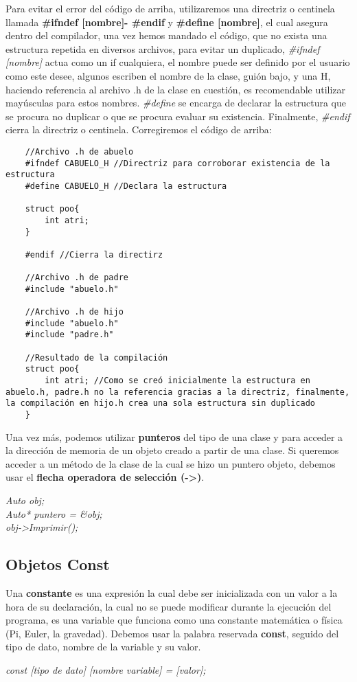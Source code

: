 Para evitar el error del código de arriba, utilizaremos una directriz o centinela llamada \textbf{\#ifndef [nombre]- \#endif} y \textbf{\#define [nombre]}, el cual asegura dentro del compilador, una vez hemos mandado el código, que no exista una estructura repetida en diversos archivos, para evitar un duplicado, \textit{\#ifndef [nombre]} actua como un if cualquiera, el nombre puede ser definido por el usuario como este desee, algunos escriben el nombre de la clase, guión bajo, y una H, haciendo referencia al archivo .h de la clase en cuestión, es recomendable utilizar mayúsculas para estos nombres. \textit{\#define} se encarga de declarar la estructura que se procura no duplicar o que se procura evaluar su existencia. Finalmente, \textit{\#endif} cierra la directriz o centinela. Corregiremos el código de arriba:
\begin{lstlisting}
    //Archivo .h de abuelo
    #ifndef CABUELO_H //Directriz para corroborar existencia de la estructura
    #define CABUELO_H //Declara la estructura
    
    struct poo{
        int atri;
    }
    
    #endif //Cierra la directirz
    
    //Archivo .h de padre
    #include "abuelo.h"
    
    //Archivo .h de hijo
    #include "abuelo.h"
    #include "padre.h"
    
    //Resultado de la compilación
    struct poo{
        int atri; //Como se creó inicialmente la estructura en abuelo.h, padre.h no la referencia gracias a la directriz, finalmente, la compilación en hijo.h crea una sola estructura sin duplicado
    }
\end{lstlisting}

Una vez más, podemos utilizar \textbf{punteros} del tipo de una clase y para acceder a la dirección de memoria de un objeto creado a partir de una clase. Si queremos acceder a un método de la clase de la cual se hizo un puntero objeto, debemos usar  el \textbf{flecha operadora de selección (->)}.
\begin{center}
    \textit{
        Auto obj; \\
        Auto* puntero = \&obj; \\
        obj->Imprimir();
    }
\end{center}


\subsection{Objetos Const}
\hspace{0.55cm}Una \textbf{constante} es una expresión la cual debe ser inicializada con un valor a la hora de su declaración, la cual no se puede modificar durante la ejecución del programa, es una variable que funciona como una constante matemática o física (Pi, Euler, la gravedad). Debemos usar la palabra reservada \textbf{const}, seguido del tipo de dato, nombre de la variable y su valor.
\begin{center}
    \textit{const [tipo de dato] [nombre variable] = [valor];}
\end{center}

